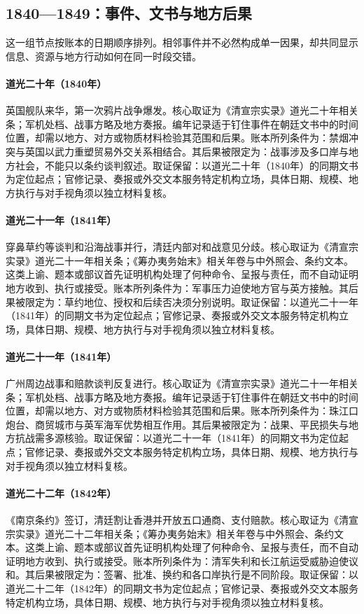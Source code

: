 \subsection{1840—1849：事件、文书与地方后果}
这一组节点按账本的日期顺序排列。相邻事件并不必然构成单一因果，却共同显示信息、资源与地方行动如何在同一时段交错。
\hypertarget{ledger:EQ-1840-FIRST-OPIUM-WAR}{}\paragraph{道光二十年（1840年）}英国舰队来华，第一次鸦片战争爆发。核心取证为《清宣宗实录》道光二十年相关条；军机处档、战事方略及地方奏报。编年记录适于钉住事件在朝廷文书中的时间位置，却需以地方、对方或物质材料检验其范围和后果。账本所列条件为：禁烟冲突与英国以武力重塑贸易外交关系相结合。其后果被限定为：战事涉及多口岸与地方社会，不能只以条约谈判叙述。取证保留：以道光二十年（1840年）的同期文书为定位起点；官修记录、奏报或外交文本服务特定机构立场，具体日期、规模、地方执行与对手视角须以独立材料复核。
\hypertarget{ledger:EQ-1841-CHUANBI-NEGOTIATIONS}{}\paragraph{道光二十一年（1841年）}穿鼻草约等谈判和沿海战事并行，清廷内部对和战意见分歧。核心取证为《清宣宗实录》道光二十一年相关条；《筹办夷务始末》相关年卷与中外照会、条约文本。这类上谕、题本或部议首先证明机构处理了何种命令、呈报与责任，而不自动证明地方收到、执行或接受。账本所列条件为：军事压力迫使地方官与英方接触。其后果被限定为：草约地位、授权和后续否决须分别说明。取证保留：以道光二十一年（1841年）的同期文书为定位起点；官修记录、奏报或外交文本服务特定机构立场，具体日期、规模、地方执行与对手视角须以独立材料复核。
\hypertarget{ledger:EQ-1841-CANTON-BATTLES}{}\paragraph{道光二十一年（1841年）}广州周边战事和赔款谈判反复进行。核心取证为《清宣宗实录》道光二十一年相关条；军机处档、战事方略及地方奏报。编年记录适于钉住事件在朝廷文书中的时间位置，却需以地方、对方或物质材料检验其范围和后果。账本所列条件为：珠江口炮台、商贸城市与英军海军优势相互作用。其后果被限定为：战果、平民损失与地方抗战需多源核验。取证保留：以道光二十一年（1841年）的同期文书为定位起点；官修记录、奏报或外交文本服务特定机构立场，具体日期、规模、地方执行与对手视角须以独立材料复核。
\hypertarget{ledger:EQ-1842-NANJING-TREATY}{}\paragraph{道光二十二年（1842年）}《南京条约》签订，清廷割让香港并开放五口通商、支付赔款。核心取证为《清宣宗实录》道光二十二年相关条；《筹办夷务始末》相关年卷与中外照会、条约文本。这类上谕、题本或部议首先证明机构处理了何种命令、呈报与责任，而不自动证明地方收到、执行或接受。账本所列条件为：清军失利和长江航运受威胁迫使议和。其后果被限定为：签署、批准、换约和各口岸执行是不同阶段。取证保留：以道光二十二年（1842年）的同期文书为定位起点；官修记录、奏报或外交文本服务特定机构立场，具体日期、规模、地方执行与对手视角须以独立材料复核。
